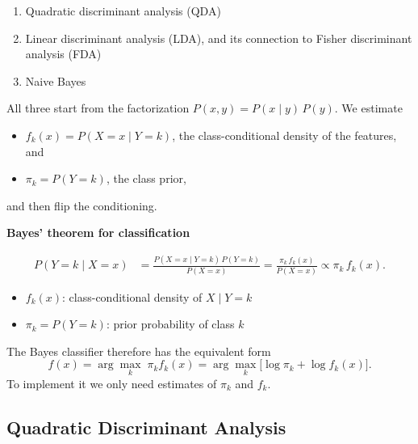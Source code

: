 \documentclass[
]{book}
\providecommand{\tightlist}{%
  \setlength{\itemsep}{0pt}\setlength{\parskip}{0pt}}
\begin{document}
\begin{enumerate}
\def\labelenumi{\arabic{enumi}.}
\tightlist
\item
  Quadratic discriminant analysis (QDA)
\item
  Linear discriminant analysis (LDA), and its connection to Fisher discriminant analysis (FDA)
\item
  Naive Bayes
\end{enumerate}

All three start from the factorization \(P(x, y) = P(x \mid y)\, P(y)\). We estimate

\begin{itemize}
\tightlist
\item
  \(f_k(x) = P(X = x \mid Y = k)\), the class-conditional density of the features, and
\item
  \(\pi_k = P(Y = k)\), the class prior,
\end{itemize}

and then flip the conditioning.

\textbf{Bayes' theorem for classification}

\begin{align*}
P(Y = k \mid X = x)
&= \frac{P(X = x \mid Y = k)\, P(Y = k)}{P(X = x)}
= \frac{\pi_k \, f_k(x)}{P(X = x)}
\propto \pi_k \, f_k(x).
\end{align*}

\begin{itemize}
\tightlist
\item
  \(f_k(x)\): class-conditional density of \(X \mid Y = k\)
\item
  \(\pi_k = P(Y = k)\): prior probability of class \(k\)
\end{itemize}

The Bayes classifier therefore has the equivalent form
\[
f(x) = \arg\max_k \; \pi_k f_k(x)
= \arg\max_k \bigl[\log \pi_k + \log f_k(x)\bigr].
\]
To implement it we only need estimates of \(\pi_k\) and \(f_k\).

\subsection{Quadratic Discriminant Analysis}\label{quadratic-discriminant-analysis}
\end{document}
